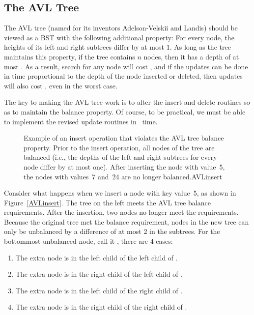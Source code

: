 \subsection{The AVL Tree}
\label{AVLsec}

The AVL tree (named for its inventors Adelson-Velskii and Landis)
should be viewed as a BST with the following additional property:
For every node, the heights of its left and right subtrees differ by
at most 1.
As long as the tree maintains this property, if the tree contains
\(n\) nodes, then it has a depth of at most \Ologn.
As a result, search for any node will cost \Ologn,
and if the updates can be done in time proportional to the depth of
the node inserted or deleted, then updates will also cost \Ologn, even 
in the worst case.

The key to making the AVL tree work is to alter the insert and delete
routines so as to maintain the balance property.
Of course, to be practical, we must be able to implement the revised
update routines in \Thetalogn\ time.

\begin{figure}
\vspace{-\bigskipamount}
{Example of an insert operation that violates the AVL tree balance
property.
Prior to the insert operation, all nodes of the tree are balanced
(i.e., the depths of the left and right subtrees for every node differ
by at most one).
After inserting the node with value~5, the nodes with values~7 and~24
are no longer balanced.}{AVLinsert}
\bigskip
\end{figure}

Consider what happens when we insert a node with key value~5,
as shown in Figure~\ref{AVLinsert}.
The tree on the left meets the AVL tree balance requirements.
After the insertion, two nodes no longer meet the requirements.
Because the original tree met the balance requirement, nodes in the
new tree can only be unbalanced by a difference of at most 2 in the
subtrees.
For the bottommost unbalanced node, call it , there are 4 cases:

\begin{enumerate}
\item The extra node is in the left child of the left child of .
\item The extra node is in the right child of the left child of .
\item The extra node is in the left child of the right child of .
\item The extra node is in the right child of the right child of .
\end{enumerate}

